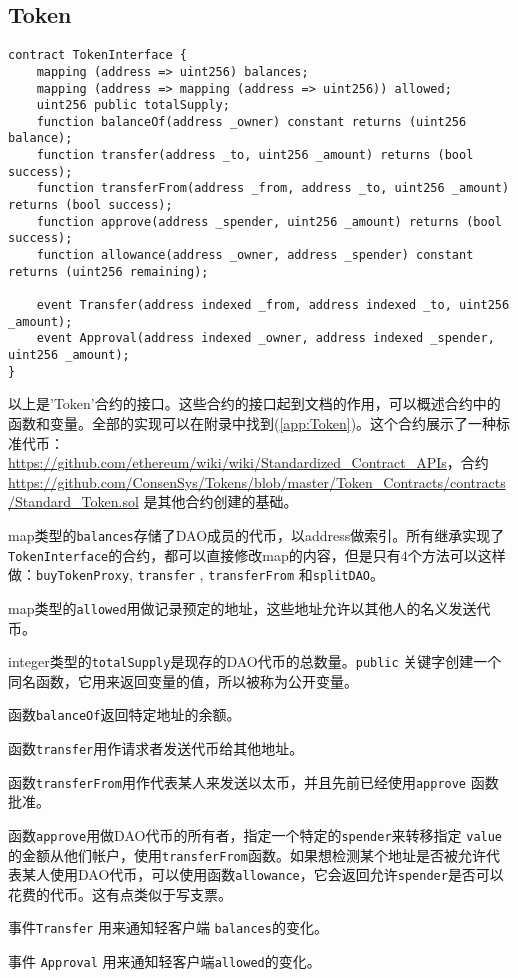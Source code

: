\documentclass[9pt,oneside]{amsart}
\begin{document}
\subsection{Token}
\begin{verbatim}
contract TokenInterface {
    mapping (address => uint256) balances;
    mapping (address => mapping (address => uint256)) allowed;
    uint256 public totalSupply;
    function balanceOf(address _owner) constant returns (uint256 balance);
    function transfer(address _to, uint256 _amount) returns (bool success);
    function transferFrom(address _from, address _to, uint256 _amount) returns (bool success);
    function approve(address _spender, uint256 _amount) returns (bool success);
    function allowance(address _owner, address _spender) constant returns (uint256 remaining);

    event Transfer(address indexed _from, address indexed _to, uint256 _amount);
    event Approval(address indexed _owner, address indexed _spender, uint256 _amount);
}
\end{verbatim} 
\begin{multicols}{2}

以上是'Token'合约的接口。这些合约的接口起到文档的作用，可以概述合约中的函数和变量。全部的实现可以在附录中找到(\ref{app:Token})。这个合约展示了一种标准代币：\url{https://github.com/ethereum/wiki/wiki/Standardized_Contract_APIs}，合约\url{https://github.com/ConsenSys/Tokens/blob/master/Token_Contracts/contracts/Standard_Token.sol} 是其他合约创建的基础。

map类型的\verb|balances|存储了DAO成员的代币，以address做索引。所有继承实现了 \verb|TokenInterface|的合约，都可以直接修改map的内容，但是只有$4$个方法可以这样做：\verb|buyTokenProxy|, \verb|transfer| , \verb|transferFrom| 和\verb|splitDAO|。


map类型的\verb|allowed|用做记录预定的地址，这些地址允许以其他人的名义发送代币。

integer类型的\verb|totalSupply|是现存的DAO代币的总数量。\verb|public| 关键字创建一个同名函数，它用来返回变量的值，所以被称为公开变量。

函数\verb|balanceOf|返回特定地址的余额。

函数\verb|transfer|用作请求者发送代币给其他地址。

函数\verb|transferFrom|用作代表某人来发送以太币，并且先前已经使用\verb|approve| 函数批准。

函数\verb|approve|用做DAO代币的所有者，指定一个特定的\verb|spender|来转移指定 \verb|value| 的金额从他们帐户，使用\verb|transferFrom|函数。如果想检测某个地址是否被允许代表某人使用DAO代币，可以使用函数\verb|allowance|，它会返回允许\verb|spender|是否可以花费的代币。这有点类似于写支票。

事件\verb|Transfer| 用来通知轻客户端 \verb|balances|的变化。

事件 \verb|Approval| 用来通知轻客户端\verb|allowed|的变化。
\end{multicols}
\end{document}
